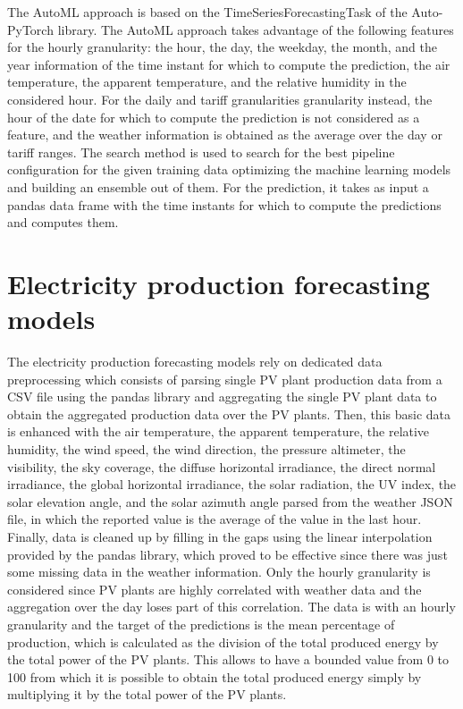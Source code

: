 The AutoML approach is based on the TimeSeriesForecastingTask of the Auto-PyTorch library.
The AutoML approach takes advantage of the following features for the hourly granularity: the hour, the day, the weekday, the month, and the year information of the time instant for which to compute the prediction, the air temperature, the apparent temperature, and the relative humidity in the considered hour.
For the daily and tariff granularities granularity instead, the hour of the date for which to compute the prediction is not considered as a feature, and the weather information is obtained as the average over the day or tariff ranges.
The search method is used to search for the best pipeline configuration for the given training data optimizing the machine learning models and building an ensemble out of them.
For the prediction, it takes as input a pandas data frame with the time instants for which to compute the predictions and computes them.


\section{Electricity production forecasting models}
\label{sec:productionimpl}
\vspace{0.2 cm}

The electricity production forecasting models rely on dedicated data preprocessing which consists of parsing single PV plant production data from a CSV file using the pandas library and aggregating the single PV plant data to obtain the aggregated production data over the PV plants.
Then, this basic data is enhanced with the air temperature, the apparent temperature, the relative humidity, the wind speed, the wind direction, the pressure altimeter, the visibility, the sky coverage, the diffuse horizontal irradiance, the direct normal irradiance, the global horizontal irradiance, the solar radiation, the UV index, the solar elevation angle, and the solar azimuth angle parsed from the weather JSON file, in which the reported value is the average of the value in the last hour.
Finally, data is cleaned up by filling in the gaps using the linear interpolation provided by the pandas library, which proved to be effective since there was just some missing data in the weather information.
Only the hourly granularity is considered since PV plants are highly correlated with weather data and the aggregation over the day loses part of this correlation.
The data is with an hourly granularity and the target of the predictions is the mean percentage of production, which is calculated as the division of the total produced energy by the total power of the PV plants.
This allows to have a bounded value from 0 to 100 from which it is possible to obtain the total produced energy simply by multiplying it by the total power of the PV plants.

